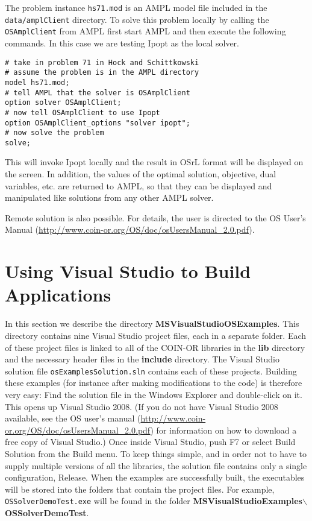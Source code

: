 \documentclass[11pt]{article}
\renewcommand{\{}{{\char"7B}}
\renewcommand{\}}{{\char"7D}}
\renewcommand{\^}{{\char"0D}}
\renewcommand{\'}{{\char"0D}}
\begin{document}
The  problem instance {\tt hs71.mod} is an AMPL model file included in the {\tt data/amplClient} directory.
To solve this problem locally by calling the {\tt OSAmplClient} from AMPL first start AMPL and then
execute the following commands. In this case we are testing  Ipopt as the
local solver.

\begin{verbatim}
# take in problem 71 in Hock and Schittkowski
# assume the problem is in the AMPL directory
model hs71.mod;
# tell AMPL that the solver is OSAmplClient
option solver OSAmplClient;
# now tell OSAmplClient to use Ipopt
option OSAmplClient_options "solver ipopt";
# now solve the problem
solve;
\end{verbatim}
This will invoke Ipopt locally and the result in OSrL format will be displayed on the screen.
In addition, the values of the optimal solution, objective, dual variables, etc. are returned to
AMPL, so that they can be displayed and manipulated like solutions from any other AMPL solver.

Remote solution is also possible. For details, the user is directed to the OS User's Manual
(\url{http://www.coin-or.org/OS/doc/osUsersManual_2.0.pdf}).


\section{Using Visual Studio to Build Applications}\label{section:visualstudio} 
In this section we describe the directory {\bf MSVisualStudioOSExamples}. 
This directory contains nine Visual Studio project files, each in a separate folder.  
Each of these project files is linked to all of the COIN-OR libraries in the {\bf lib} directory
and the necessary header files in the {\bf include} directory. The Visual Studio solution file 
{\tt osExamplesSolution.sln} contains each of these projects. Building these examples (for instance
after making modifications to the code) is therefore very easy: Find the solution file in the
Windows Explorer and double-click on it. This opens up Visual Studio 2008. 
(If you do not have Visual Studio 2008 available, see the OS user's manual 
(\url{http://www.coin-or.org/OS/doc/osUsersManual_2.0.pdf})
for information on how to download a free copy of Visual Studio.) 
Once inside Visual Studio, push F7 or select Build Solution from the Build menu.
To keep things simple, and in order not to have to supply multiple versions of all the libraries,
the solution file contains only a single configuration, Release.
When the examples are successfully built, the executables will be stored into the folders that
contain the project files. For example, {\tt OSSolverDemoTest.exe} will be found in the folder 
{\bf MSVisualStudioExamples$\backslash$OSSolverDemoTest}.
 
\end{document}
